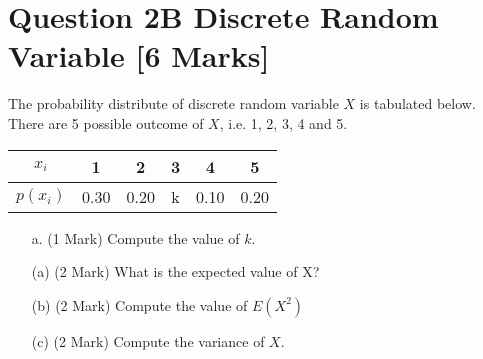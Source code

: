\newpage
\section*{Question 2B Discrete Random Variable [6 Marks]}
The probability distribute of discrete random variable $X$ is tabulated below. There are 5 possible outcome of $X$, i.e. 1, 2, 3, 4 and 5.
\begin{center}
\begin{tabular}{|c||c|c|c|c|c|}
\hline
$x_i$  & 1 & 2 & 3 & 4 & 5  \\\hline
$p(x_i)$ & 0.30 & 0.20 & k & 0.10 & 0.20 \\
\hline
\end{tabular}
\end{center}

\begin{itemize}
\item[a.] (1 Mark) Compute the value of $k$.
\item[(a)] (2 Mark) What is the expected value of X?
\item[(b)] (2 Mark) Compute the value of $E(X^2)$
\item[(c)] (2 Mark) Compute the variance of $X$.
\end{itemize}

